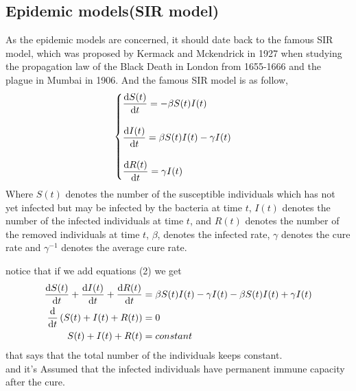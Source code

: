 \subsection{Epidemic models(SIR model)}
As the epidemic models are concerned, it should date back to the famous SIR model,
which was proposed by Kermack and Mckendrick in 1927 when studying the propagation
law of the Black Death in London from 1655-1666 and the plague in Mumbai in 1906.
And the famous SIR model is as follow,
\begin{equation}
    \begin{cases}
        \displaystyle \dv{S(t)}{t} = -\beta S(t)I(t)
        \\\\
        \displaystyle \dv{I(t)}{t} = \beta S(t)I(t)-\gamma I(t)
        \\\\
        \displaystyle \dv{R(t)}{t} = \gamma I(t)
    \end{cases}
\end{equation}
Where $S(t)$ denotes the number of the susceptible individuals which has not yet infected
but may be infected by the bacteria at time $t$, $I(t)$ denotes the number of the infected
individuals at time $t$, and $R(t)$ denotes the number of the removed individuals at time $t$, $\beta$,
denotes the infected rate, $\gamma$ denotes the cure rate and $\gamma^{-1}$ denotes the average cure rate.

notice that if we add equations (2) we get
\begin{align*}
    \dv{S(t)}{t} + \dv{I(t)}{t} + \dv{R(t)}{t} & = \beta S(t)I(t)-\gamma I(t) -\beta S(t)I(t) + \gamma I(t)
    \\
    \dv{}{t} \left(S(t) + I(t) + R(t)\right)   & = 0
    \\
    S(t) + I(t) + R(t)                         & = constant
\end{align*}
that says that the total number of the individuals keeps constant.
\\
and it's Assumed that the infected individuals have permanent immune capacity after the cure.




